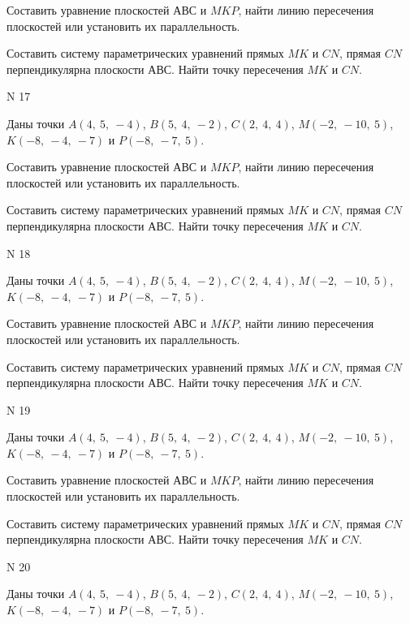 \documentclass[11pt]{report}
\begin{document}
Составить уравнение плоскостей $АВС$ и $MKP$,
найти линию пересечения плоскостей или установить их параллельность.

Составить систему параметрических уравнений прямых $MK$ и $CN$,
прямая $CN$ перпендикулярна плоскости $АВС$. 
Найти точку пересечения $MK$ и $CN$.



 N 17

Даны точки $A\left( 4, \  5, \  -4\right)$, $B\left( 5, \  4, \  -2\right)$, $C\left( 2, \  4, \  4\right)$, $M\left( -2, \  -10, \  5\right)$, $K\left( -8, \  -4, \  -7\right)$ и $P\left( -8, \  -7, \  5\right)$.


Составить уравнение плоскостей $АВС$ и $MKP$,
найти линию пересечения плоскостей или установить их параллельность.

Составить систему параметрических уравнений прямых $MK$ и $CN$,
прямая $CN$ перпендикулярна плоскости $АВС$. 
Найти точку пересечения $MK$ и $CN$.



 N 18

Даны точки $A\left( 4, \  5, \  -4\right)$, $B\left( 5, \  4, \  -2\right)$, $C\left( 2, \  4, \  4\right)$, $M\left( -2, \  -10, \  5\right)$, $K\left( -8, \  -4, \  -7\right)$ и $P\left( -8, \  -7, \  5\right)$.


Составить уравнение плоскостей $АВС$ и $MKP$,
найти линию пересечения плоскостей или установить их параллельность.

Составить систему параметрических уравнений прямых $MK$ и $CN$,
прямая $CN$ перпендикулярна плоскости $АВС$. 
Найти точку пересечения $MK$ и $CN$.



 N 19

Даны точки $A\left( 4, \  5, \  -4\right)$, $B\left( 5, \  4, \  -2\right)$, $C\left( 2, \  4, \  4\right)$, $M\left( -2, \  -10, \  5\right)$, $K\left( -8, \  -4, \  -7\right)$ и $P\left( -8, \  -7, \  5\right)$.


Составить уравнение плоскостей $АВС$ и $MKP$,
найти линию пересечения плоскостей или установить их параллельность.

Составить систему параметрических уравнений прямых $MK$ и $CN$,
прямая $CN$ перпендикулярна плоскости $АВС$. 
Найти точку пересечения $MK$ и $CN$.



 N 20

Даны точки $A\left( 4, \  5, \  -4\right)$, $B\left( 5, \  4, \  -2\right)$, $C\left( 2, \  4, \  4\right)$, $M\left( -2, \  -10, \  5\right)$, $K\left( -8, \  -4, \  -7\right)$ и $P\left( -8, \  -7, \  5\right)$.
\end{document}
